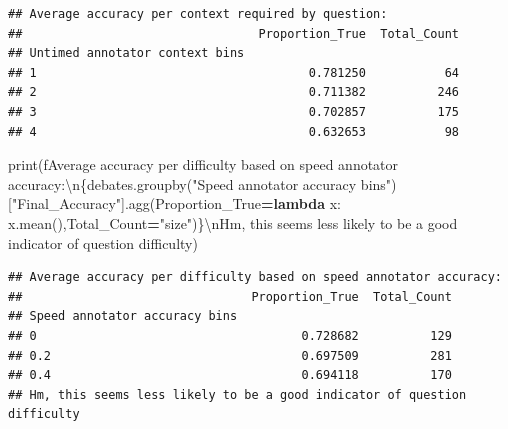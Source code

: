 \documentclass[
]{article}
\newenvironment{Shaded}{\begin{snugshade}}{\end{snugshade}}
\newcommand{\BuiltInTok}[1]{#1}
\newcommand{\CharTok}[1]{\textcolor[rgb]{0.31,0.60,0.02}{#1}}
\newcommand{\KeywordTok}[1]{\textcolor[rgb]{0.13,0.29,0.53}{\textbf{#1}}}
\newcommand{\NormalTok}[1]{#1}
\newcommand{\OperatorTok}[1]{\textcolor[rgb]{0.81,0.36,0.00}{\textbf{#1}}}
\newcommand{\SpecialCharTok}[1]{\textcolor[rgb]{0.00,0.00,0.00}{#1}}
\newcommand{\SpecialStringTok}[1]{\textcolor[rgb]{0.31,0.60,0.02}{#1}}
\newcommand{\StringTok}[1]{\textcolor[rgb]{0.31,0.60,0.02}{#1}}
\begin{document}
\begin{verbatim}
## Average accuracy per context required by question:
##                                 Proportion_True  Total_Count
## Untimed annotator context bins                              
## 1                                      0.781250           64
## 2                                      0.711382          246
## 3                                      0.702857          175
## 4                                      0.632653           98
\end{verbatim}

\begin{Shaded}
\begin{Highlighting}[]
\BuiltInTok{print}\NormalTok{(}\SpecialStringTok{f\textquotesingle{}Average accuracy per difficulty based on speed annotator accuracy:}\CharTok{\textbackslash{}n}\SpecialCharTok{\{}\NormalTok{debates}\SpecialCharTok{.}\NormalTok{groupby(}\StringTok{"Speed annotator accuracy bins"}\NormalTok{)[}\StringTok{"Final\_Accuracy"}\NormalTok{]}\SpecialCharTok{.}\NormalTok{agg(Proportion\_True}\OperatorTok{=}\KeywordTok{lambda}\NormalTok{ x: x.mean(),Total\_Count}\OperatorTok{=}\StringTok{"size"}\NormalTok{)}\SpecialCharTok{\}}\CharTok{\textbackslash{}n}\SpecialStringTok{Hm, this seems less likely to be a good indicator of question difficulty\textquotesingle{}}\NormalTok{)}
\end{Highlighting}
\end{Shaded}

\begin{verbatim}
## Average accuracy per difficulty based on speed annotator accuracy:
##                                Proportion_True  Total_Count
## Speed annotator accuracy bins                              
## 0                                     0.728682          129
## 0.2                                   0.697509          281
## 0.4                                   0.694118          170
## Hm, this seems less likely to be a good indicator of question difficulty
\end{verbatim}
\end{document}

